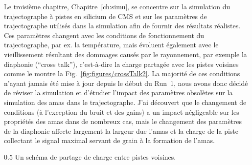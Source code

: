 Le troisième chapitre, Chapitre~\ref{ch:simu}, se concentre sur la simulation du trajectographe à  pistes en silicium de CMS et sur les paramètres de trajectographe utilisés dans la simulation afin de fournir des résultats réalistes. Ces paramètres changent avec les conditions de fonctionnement du trajectographe, par ex. la température, mais évoluent également avec le vieillissement résultant des dommages causés par le rayonnement, par exemple la diaphonie (``cross talk''), c'est-à-dire la charge partagée avec les pistes voisines comme le montre la Fig.~\ref{fig:figures/crossTalk2}. La majorité de ces conditions n’ayant jamais été mise à jour depuis le début du Run~1, nous avons donc décidé de réviser la simulation et d’étudier l’impact des paramètres obsolètes sur la simulation des amas dans le trajectographe. J'ai découvert que le changement de conditions (à l'exception du bruit et des gains) a un impact négligeable sur les propriétés des amas dans de nombreux cas, mais le changement des paramètres de la diaphonie affecte largement la largeur due l'amas et la charge de la piste collectant le signal maximal servant de grain à la formation de l'amas.

                 {0.5}       %
                 {Un schéma de partage de charge entre pistes voisines. }

